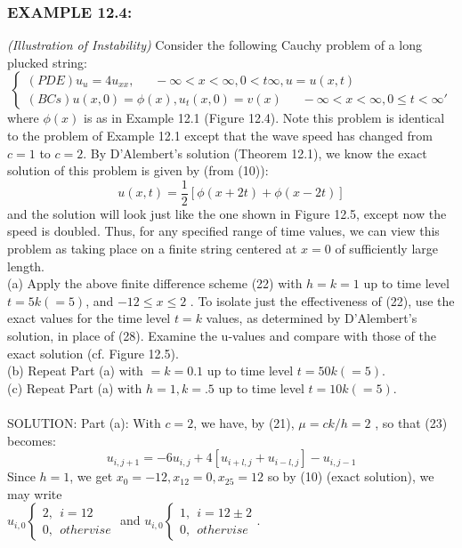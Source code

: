 \documentclass[../main.tex]{subfiles}
\begin{document}
\subsubsection{EXAMPLE 12.4:}
 \textit{(Illustration of Instability)} Consider the following Cauchy 
problem of a long plucked string: 
$$\begin{cases} 
	(PDE)u_u=4u_{xx}, ~~~~~~~ - \infty< x< \infty, 0<t \infty , u=u(x,t) \\ 
	(BCs) u(x,0)=\phi (x), u_t(x,0)=v(x) ~~~~~~~
	-\infty< x< \infty, 0\leqslant t< \infty ' 
\end{cases}$$
where $\phi(x)$ is as in Example 12.1 (Figure 12.4). Note this problem is identical to the problem of Example 12.1 except that the wave speed has changed from $c = 1$ to $c = 2$. By D'Alembert's solution (Theorem 12.1), we know the exact solution of this problem is given by (from (10)):
$$u(x,t)=\dfrac{1}{2}[\phi(x+2t)+\phi(x-2t)]$$ 
and the solution will look just like the one shown in Figure 12.5, except now the speed is doubled. Thus, for any specified range of time values, we can view this problem as taking place on a finite string centered at $x = 0$ of sufficiently large length.
\\
(a) Apply the above finite difference scheme (22) with $h = k = 1$ up to time level $t = 5k(= 5)$, and $-12 \leqslant x \leqslant 2$ . To isolate just the effectiveness of (22), use the exact values for the time level $t = k$ values, as determined by D'Alembert's solution, in place of (28). Examine the u-values and compare with those of the exact solution (cf. Figure 12.5). 
\\
(b) Repeat Part (a) with $ = k = 0.1$ up to time level $t = 50k (= 5)$.
\\ 
(c) Repeat Part (a) with $h = 1, k = .5$ up to time level $t = 10k (= 5)$.
\\
\\
SOLUTION: Part (a): With $c = 2$, we have, by (21), $\mu = ck/h = 2$ , so that (23) becomes: 
$$u_{i,j+1}=-6u_{i,j}+4[u_{i+l,j}+u_{i-l,j}]-u_{i,j-1}$$
Since $h = 1$, we get $x_0 = -12, x_{12} = 0, x_{25} = 12$ so by (10) (exact solution), we may write
\\
$u_{i,0}
	\begin{cases}
		2, ~~i=12\\
		0, ~~othervise
	\end{cases}$ and
$u_{i,0}
	\begin{cases}
		1, ~~i=12\pm 2\\
		0, ~~othervise
	\end{cases}$. 
\end{document}
